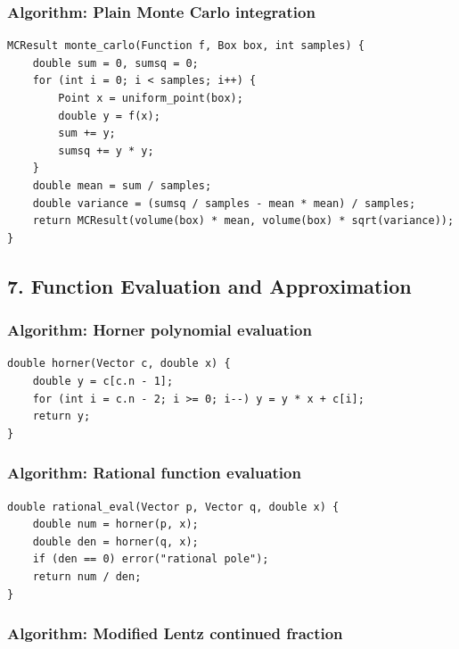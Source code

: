 \documentclass[11pt]{article}
\begin{document}
\subsubsection{Algorithm: Plain Monte Carlo integration}\label{algorithm-plain-monte-carlo-integration}

\begin{verbatim}
MCResult monte_carlo(Function f, Box box, int samples) {
    double sum = 0, sumsq = 0;
    for (int i = 0; i < samples; i++) {
        Point x = uniform_point(box);
        double y = f(x);
        sum += y;
        sumsq += y * y;
    }
    double mean = sum / samples;
    double variance = (sumsq / samples - mean * mean) / samples;
    return MCResult(volume(box) * mean, volume(box) * sqrt(variance));
}
\end{verbatim}

\subsection{7. Function Evaluation and Approximation}\label{function-evaluation-and-approximation}

\subsubsection{Algorithm: Horner polynomial evaluation}\label{algorithm-horner-polynomial-evaluation}

\begin{verbatim}
double horner(Vector c, double x) {
    double y = c[c.n - 1];
    for (int i = c.n - 2; i >= 0; i--) y = y * x + c[i];
    return y;
}
\end{verbatim}

\subsubsection{Algorithm: Rational function evaluation}\label{algorithm-rational-function-evaluation}

\begin{verbatim}
double rational_eval(Vector p, Vector q, double x) {
    double num = horner(p, x);
    double den = horner(q, x);
    if (den == 0) error("rational pole");
    return num / den;
}
\end{verbatim}

\subsubsection{Algorithm: Modified Lentz continued fraction}\label{algorithm-modified-lentz-continued-fraction}
\end{document}

